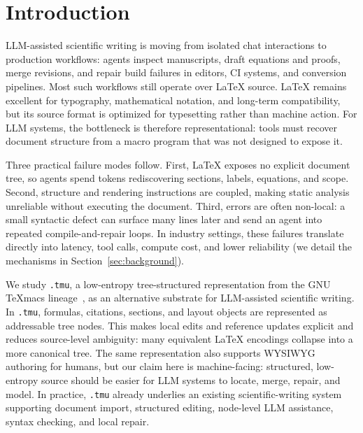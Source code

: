 \section{Introduction}
\label{sec:introduction}

LLM-assisted scientific writing is moving from isolated chat interactions to production workflows: agents inspect manuscripts, draft equations and proofs, merge revisions, and repair build failures in editors, CI systems, and conversion pipelines. Most such workflows still operate over {\LaTeX} source. {\LaTeX} remains excellent for typography, mathematical notation, and long-term compatibility, but its source format is optimized for typesetting rather than machine action. For LLM systems, the bottleneck is therefore representational: tools must recover document structure from a macro program that was not designed to expose it.

Three practical failure modes follow. First, {\LaTeX} exposes no explicit document tree, so agents spend tokens rediscovering sections, labels, equations, and scope. Second, structure and rendering instructions are coupled, making static analysis unreliable without executing the document. Third, errors are often non-local: a small syntactic defect can surface many lines later and send an agent into repeated compile-and-repair loops. In industry settings, these failures translate directly into latency, tool calls, compute cost, and lower reliability (we detail the mechanisms in Section~\ref{sec:background}).

We study \texttt{.tmu}, a low-entropy tree-structured representation from the GNU {\TeX}macs lineage~\cite{van_der_hoeven_gnu_2001}, as an alternative substrate for LLM-assisted scientific writing. In \texttt{.tmu}, formulas, citations, sections, and layout objects are represented as addressable tree nodes. This makes local edits and reference updates explicit and reduces source-level ambiguity: many equivalent {\LaTeX} encodings collapse into a more canonical tree. The same representation also supports WYSIWYG authoring for humans, but our claim here is machine-facing: structured, low-entropy source should be easier for LLM systems to locate, merge, repair, and model. In practice, \texttt{.tmu} already underlies an existing scientific-writing system supporting document import, structured editing, node-level LLM assistance, syntax checking, and local repair.

